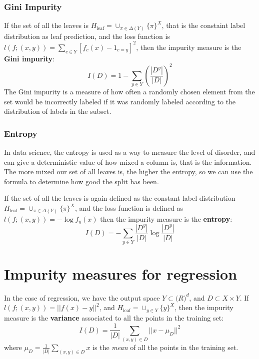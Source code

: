\subsubsection{Gini Impurity}
If the set of all the leaves is \(H_\text{leaf} = \cup_{\pi \in \Delta(Y)} \{\pi\}^X\), that is the constaint label distribution as leaf prediction, and the loss function is \(l(f;(x,y)) = \sum_{c \in Y} [f_c(x) - 1_{c=y}]^2\), then the impurity measure is the \textbf{Gini impurity}:
\begin{equation}
    I(D) = 1 - \sum_{y \in Y} \left( \frac {|D^y|} {|D|} \right) ^2
\end{equation}
The Gini impurity is a measure of how often a randomly chosen element from the set would be incorrectly labeled if it was randomly labeled according to the distribution of labels in the subset.

\subsubsection{Entropy}
In data science, the entropy is used as a way to measure the level of disorder, and can give a deterministic value of how mixed a column is, that is the information. The more mixed our set of all leaves is, the higher the entropy, so we can use the formula to determine how good the split has been.

If the set of all the leaves is again defined as the constant label distribution \(H_\text{leaf} = \cup_{\pi \in \Delta(Y)} \{\pi\}^X\), and the loss function is defined as \(l(f;(x,y)) = -\log f_y(x)\) then the impurity measure is the \textbf{entropy}:
\begin{equation}
    I(D) = - \sum_{y \in Y} \frac {|D^y|} {|D|} \log \frac {|D^y|} {|D|}
\end{equation}

\section{Impurity measures for regression}
In the case of regression, we have the output space \(Y \subset \mathbb(R)^d\), and \(D \subset X \times Y\). If \(l(f;(x,y)) = ||f(x) - y||^2\), and \(H_\text{leaf}=\cup_{y \in Y} \{y\}^X\), then the impurity measure is the \textbf{variance} associated to all the points in the  training set:
\begin{equation}
    I(D) = \frac 1 {|D|} \sum_{(x,y) \in D} ||x - \mu_D||^2
\end{equation}
where \(\mu_D = \frac 1 {|D|} \sum_{(x,y) \in D} x\) is the \emph{mean} of all the points in the training set.

